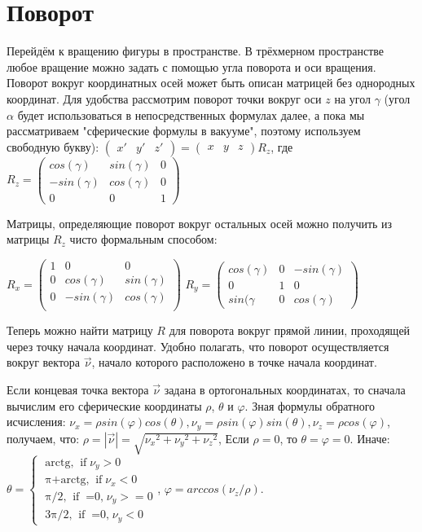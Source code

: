 \documentclass [12pt, a4paper] {article}
\begin{document}
\section {Поворот}
Перейдём к вращению фигуры в пространстве. В трёхмерном пространстве любое вращение можно задать с помощью угла поворота и оси вращения.
Поворот вокруг координатных осей может быть описан матрицей без однородных координат.
Для удобства рассмотрим поворот точки вокруг оси $z$ на угол $\gamma$ (угол $\alpha$ будет использоваться в непосредственных формулах далее, а пока мы рассматриваем "сферические формулы в вакууме", поэтому используем свободную букву):
$\begin {pmatrix}
	x' & y' & z'
\end {pmatrix} = \begin {pmatrix}
	x & y & z
\end {pmatrix} R_z$, где $R_z = \begin {pmatrix}
	cos(\gamma) & sin(\gamma) & 0 \\
	-sin(\gamma) & cos(\gamma) & 0 \\
	0 & 0 & 1
\end {pmatrix}$

Матрицы, определяющие поворот вокруг остальных осей можно получить из матрицы $R_z$ чисто формальным способом:

$R_x = \begin {pmatrix}
	1 & 0 & 0 \\
	0 & cos(\gamma) & sin(\gamma) \\
	0 & -sin(\gamma) & cos(\gamma) \\
\end {pmatrix}$ 
$R_y = \begin {pmatrix}
	cos(\gamma) & 0 & -sin(\gamma) \\
	0 & 1 & 0 \\
	sin(\gamma & 0 & cos(\gamma)
\end {pmatrix}$

Теперь можно найти матрицу $R$ для поворота вокруг прямой линии, проходящей через точку начала координат. Удобно полагать, что поворот осуществляется вокруг вектора $\overrightarrow{\nu}$, начало которого расположено в точке начала координат.

Если концевая точка вектора $\overrightarrow{\nu}$ задана в ортогональных координатах, то сначала вычислим его сферические координаты $\rho$, $\theta$ и $\varphi$. Зная формулы обратного исчисления:
$\nu_x = \rho sin(\varphi) cos(\theta), \nu_y = \rho sin(\varphi) sin(\theta), \nu_z = \rho cos(\varphi)$, получаем, что:
$\rho = |\overrightarrow{\nu}| = \sqrt{{\nu_x}^2 + {\nu_y}^2 + {\nu_z}^2}$, 
Если $\rho = 0$, то $\theta = \varphi = 0$. Иначе:
$\theta = \left\{
	\begin {aligned}
		\mathop{arctg(\nu_y/\nu_x),} \mathop{if} \nu_y > 0 \\
		\mathop{\pi + arctg(\nu_y/\nu_x),} \mathop{if} \nu_x < 0 \\
		\mathop{\pi/2,} \mathop{if} \mathop{\nu_x = 0,} \nu_y >= 0 \\
		\mathop{3\pi/2,} \mathop{if} \mathop{\nu_x = 0,} \nu_y < 0
	\end {aligned}
\right.$, $\varphi = arccos(\nu_z/\rho)$.
\end{document}
